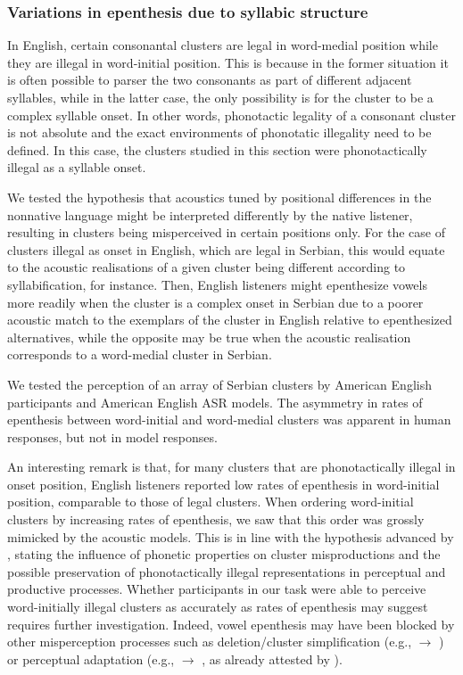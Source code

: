 {%
\subsubsection{Variations in epenthesis due to syllabic structure}
In English, certain consonantal clusters are legal in word-medial position while they are illegal in word-initial position. This is because in the former situation it is often possible to parser the two consonants as part of different adjacent syllables, while in the latter case, the only possibility is for the cluster to be a complex syllable onset. In other words, phonotactic legality of a consonant cluster is not absolute and the exact environments of phonotatic illegality need to be defined. In this case, the clusters studied in this section were phonotactically illegal as a syllable onset.

We tested the hypothesis that acoustics tuned by positional differences in the nonnative language might be interpreted differently by the native listener, resulting in clusters being misperceived in certain positions only. For the case of clusters illegal as onset in English, which are legal in Serbian, this would equate to the acoustic realisations of a given cluster being different according to syllabification, for instance. Then, English listeners might epenthesize vowels more readily when the cluster is a complex onset in Serbian due to a poorer acoustic match to the exemplars of the cluster in English relative to epenthesized alternatives, while the opposite may be true when the acoustic realisation corresponds to a word-medial cluster in Serbian.

We tested the perception of an array of Serbian clusters by American English participants and American English ASR models. The asymmetry in rates of epenthesis between word-initial and word-medial clusters was apparent in human responses, but not in model responses.

An interesting remark is that, for many clusters that are phonotactically illegal in onset position, English listeners reported low rates of epenthesis in word-initial position, comparable to those of legal clusters. When ordering word-initial clusters by increasing rates of epenthesis, we saw that this order was grossly mimicked by the acoustic models. This is in line with the hypothesis advanced by \cite{wilson2013, wilson2014}, stating the influence of phonetic properties on cluster misproductions and the possible preservation of phonotactically illegal representations in perceptual and productive processes. Whether participants in our task were able to perceive word-initially illegal clusters as accurately as rates of epenthesis may suggest requires further investigation. Indeed, vowel epenthesis may have been blocked by other misperception processes such as deletion/cluster simplification (e.g.,  $\rightarrow$ ) or perceptual adaptation (e.g.,  $\rightarrow$ , as already attested by \cite{halle2007}).  

}

